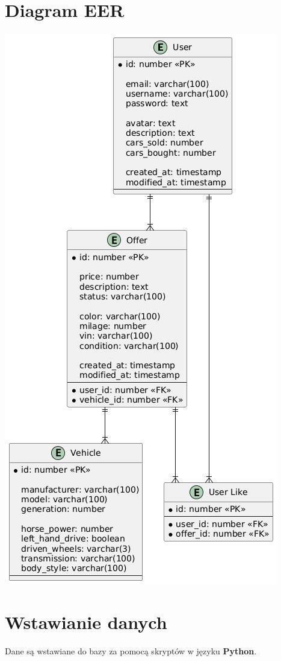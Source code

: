 \documentclass[a4paper,11pt]{article}
\begin{document}
\section*{Diagram EER}
\includegraphics[height=\textheight]{database_nosql.png}
\pagebreak

\section*{Wstawianie danych}
Dane są wstawiane do bazy za pomocą skryptów w języku \textbf{Python}.
\end{document}
